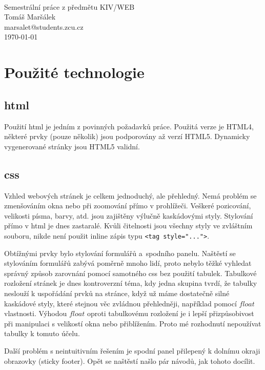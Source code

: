 \documentclass[12pt]{article}
\begin{document}
\begin{titlepage}
\begin{center}
\mbox{} \\[3cm]
\huge{Semestrální práce z předmětu KIV/WEB} \\[2cm]
\Large{Tomáš Maršálek} \\
\large{marsalet@students.zcu.cz} \\[1cm]
\normalsize{\today}
\end{center}
\end{titlepage}

\section{Použité technologie}
\subsection{html}
Použití html je jedním z povinných požadavků práce. Použitá verze je HTML4,
některé prvky (pouze několik) jsou podporovány až verzí HTML5. Dynamicky
vygenerované stránky jsou HTML5 validní.

\subsection{css}
Vzhled webových stránek je celkem jednoduchý, ale přehledný. Nemá problém se
zmenšováním okna nebo při zoomování přímo v prohlížeči. Veškeré pozicování,
velikosti písma, barvy, atd. jsou zajištěny výlučně kaskádovými styly.
Stylování přímo v html je dnes zastaralé. Kvůli čitelnosti jsou všechny styly
ve zvláštním souboru, nikde není použit inline zápis typu 
\verb|<tag style="...">|. 

Obtížnými prvky bylo stylování formulářů a~spodního panelu. Naštěstí se
stylováním formulářů zabývá poměrně mnoho lidí, proto nebylo těžké vyhledat
správný způsob zarovnání pomocí samotného css bez použití tabulek. Tabulkové
rozložení stránek je dnes kontroverzní téma, kdy jedna skupina tvrdí, že
tabulky neslouží k uspořádání prvků na stránce, když už máme dostatečně silné
kaskádové styly, které stejnou věc zvládnou přehledněji, například pomocí
$float$ vlastnosti.  Výhodou $float$ oproti tabulkovému rozložení je i lepší
přizpůsobivost při manipulaci s velikostí okna nebo přiblížením.  Proto mé
rozhodnutí nepoužívat tabulky k tomuto účelu.

Další problém s neintuitivním řešením je spodní panel přilepený
k dolnímu okraji obrazovky (sticky footer). Opět se naštěstí našlo pár návodů,
jak tohoto docílit.
\end{document}
